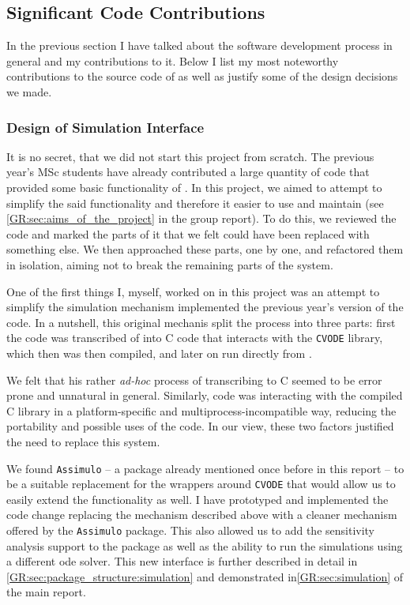 \subsection{Significant Code Contributions}

In the previous section I have talked about the software development process in general and my contributions to it. 
Below I list my most noteworthy contributions to the source code of \means{} as well as justify some of the design decisions we made.

\subsubsection{Design of Simulation Interface}

It is no secret, that we did not start this project from scratch.
The previous year's MSc students have already contributed a large quantity of \py{} code that provided some basic functionality of \means{}. In this project, we aimed to attempt to simplify the said functionality and therefore it easier to use and maintain (see \autoref*{GR:sec:aims_of_the_project} in the group report).
To do this, we reviewed the code and marked the parts of it that we felt could have been replaced with something else. 
We then approached these parts, one by one, and refactored them in isolation, aiming not to break the remaining parts of the system.

One of the first things I, myself, worked on in this project was an attempt to simplify the simulation mechanism implemented the previous year's version of the code. In a nutshell, this original mechanis split the process into three parts: first the \python{} code was transcribed of into C code that interacts with the \verb"CVODE" library\cite{hindmarsh_sundials_2005}, which then was then compiled, and later on run directly from \py{}.

We felt that his rather \emph{ad-hoc} process of transcribing \py{} to C seemed to be error prone and unnatural in general. 
Similarly, \py{} code was interacting with the compiled C library in a platform-specific and multiprocess-incompatible way, reducing the portability and possible uses of the code. In our view, these two factors justified the need to replace this system.

We found \verb"Assimulo" -- a package already mentioned once before in this report -- to be a suitable replacement for the wrappers around \verb"CVODE" that would allow us to easily extend the functionality as well. 
I have prototyped and implemented the code change replacing the mechanism described above with a cleaner mechanism offered by the \verb"Assimulo" package. This also allowed us to add the sensitivity analysis support to the \means{} package as well as the ability to run the simulations using a different \gls{ode} solver.
This new interface is further described in detail in \autoref*{GR:sec:package_structure:simulation} and demonstrated in\autoref*{GR:sec:simulation} of the main report.

